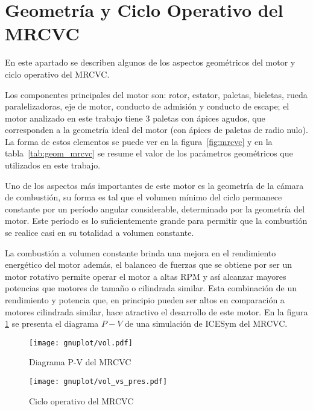 \section{Geometría y Ciclo Operativo del MRCVC}
%
En este apartado se describen algunos de los aspectos geométricos del motor y
ciclo operativo del MRCVC.

Los componentes principales del motor son: rotor, estator, paletas, bieletas,
rueda paralelizadoras, eje de motor, conducto de admisión y conducto de escape;
el motor analizado en este trabajo tiene 3 paletas con ápices agudos, que
corresponden a la geometría ideal del motor (con ápices de paletas de radio
nulo).
%
La forma de estos elementos se puede ver en la figura~\ref{fig:mrcvc} y en la
tabla~\ref{tab:geom_mrcvc} se resume el valor de los parámetros geométricos que
utilizados en este trabajo.


Uno de los aspectos más importantes de este motor es la geometría de la cámara
de combustión, su forma es tal que el volumen mínimo del ciclo permanece
constante por un período angular considerable, determinado por la geometría del
motor.
%
Este período es lo suficientemente grande para permitir que la combustión se
realice casi en su totalidad a volumen constante.
%

La combustión a volumen constante brinda una mejora en el rendimiento energético
del motor además, el balanceo de fuerzas que se obtiene por ser un motor
rotativo permite operar el motor a altas RPM y así alcanzar mayores potencias
que motores de tamaño o cilindrada similar.
%
Esta combinación de un rendimiento y potencia que, en principio pueden ser altos
en comparación a motores cilindrada similar, hace atractivo el desarrollo de
este motor.
%
En la figura \ref{fig:ciclo_pv_mrcvc} se presenta el diagrama $P-V$ de una
simulación de ICESym del MRCVC.


\begin{figure}[ht]
  \centering
  \texttt{[image: gnuplot/vol.pdf]}
  \caption{Diagrama P-V del MRCVC}\label{fig:ciclo_pv_mrcvc}
\end{figure}

\begin{figure}[ht]
  \centering
  \texttt{[image: gnuplot/vol\_vs\_pres.pdf]}
  \caption{Ciclo operativo del MRCVC}\label{fig:ciclo_mrcvc}
\end{figure}


